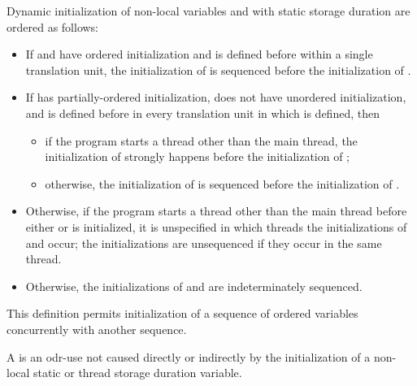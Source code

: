 \pnum
Dynamic initialization of non-local variables  and 
with static storage duration are ordered as follows:
\begin{itemize}
\item
If  and  have
ordered initialization and  is defined before  within
a single translation unit, the initialization of  is sequenced
before the initialization of .

\item
If  has partially-ordered initialization,  does not have
unordered initialization, and  is defined before  in
every translation unit in which  is defined, then
\begin{itemize}
\item
if the program starts a thread
other than the main thread,
the initialization of 
strongly happens before
the initialization of ;
\item
otherwise,
the initialization of 
is sequenced before
the initialization of .
\end{itemize}

\item
Otherwise, if the program starts a thread
other than the main thread
before either  or  is initialized,
it is unspecified in which threads
the initializations of  and  occur;
the initializations are unsequenced if they occur in the same thread.

\item
Otherwise, the initializations of  and  are indeterminately sequenced.
\end{itemize}
\begin{note}
This definition permits initialization of a sequence of
ordered variables concurrently with another sequence.
\end{note}

\pnum
{}%
A 
is an odr-use not caused directly or indirectly by
the initialization of a non-local static or thread storage duration variable.

